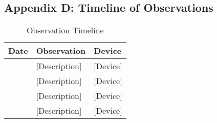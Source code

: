 \documentclass[11pt, a4paper]{article}
\begin{document}
\subsection{Appendix D: Timeline of Observations}
\begin{table}[H]
\centering
\caption{Observation Timeline}
\label{tab:observation_timeline}
\begin{tabular}{@{}p{2.5cm}p{5cm}p{2.5cm}@{}}
\toprule
\textbf{Date} & \textbf{Observation} & \textbf{Device} \\ \midrule
[Date 1] & [Description] & [Device] \\
[Date 2] & [Description] & [Device] \\
[Date 3] & [Description] & [Device] \\
[Date 4] & [Description] & [Device] \\ \bottomrule
\end{tabular}
\end{table}
\end{document}
